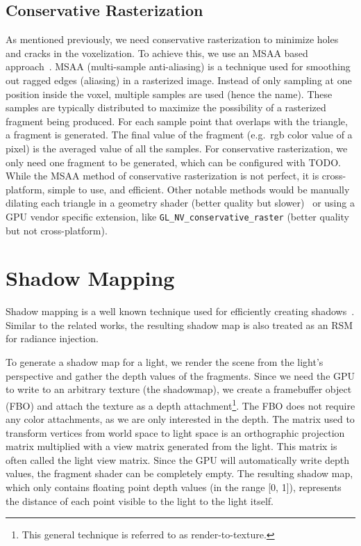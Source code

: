 \subsection{Conservative Rasterization}
As mentioned previously, we need conservative rasterization to minimize holes and cracks in the voxelization. To achieve this, we use an MSAA based approach~\cite{takeshige2015basics}. MSAA (multi-sample anti-aliasing) is a technique used for smoothing out ragged edges (aliasing) in a rasterized image. Instead of only sampling at one position inside the voxel, multiple samples are used (hence the name). These samples are typically distributed to maximize the possibility of a rasterized fragment being produced. For each sample point that overlaps with the triangle, a fragment is generated. The final value of the fragment (e.g.\ rgb color value of a pixel) is the averaged value of all the samples. For conservative rasterization, we only need one fragment to be generated, which can be configured with TODO. While the MSAA method of conservative rasterization is not perfect, it is cross-platform, simple to use, and efficient. Other notable methods would be manually dilating each triangle in a geometry shader (better quality but slower)~\cite{akenine2005conservative} or using a GPU vendor specific extension, like \verb#GL_NV_conservative_raster# (better quality but not cross-platform).



\section{Shadow Mapping}
Shadow mapping is a well known technique used for efficiently creating shadows~\cite{Williams:1978:CCS:965139.807402}. Similar to the related works, the resulting shadow map is also treated as an RSM for radiance injection.

To generate a shadow map for a light, we render the scene from the light's perspective and gather the depth values of the fragments. Since we need the GPU to write to an arbitrary texture (the shadowmap), we create a framebuffer object (FBO) and attach the texture as a depth attachment\footnote{This general technique is referred to as render-to-texture.}. The FBO does not require any color attachments, as we are only interested in the depth. The matrix used to transform vertices from world space to light space is an orthographic projection matrix multiplied with a view matrix generated from the light. This matrix is often called the light view matrix. Since the GPU will automatically write depth values, the fragment shader can be completely empty. The resulting shadow map, which only contains floating point depth values (in the range [0, 1]), represents the distance of each point visible to the light to the light itself.

